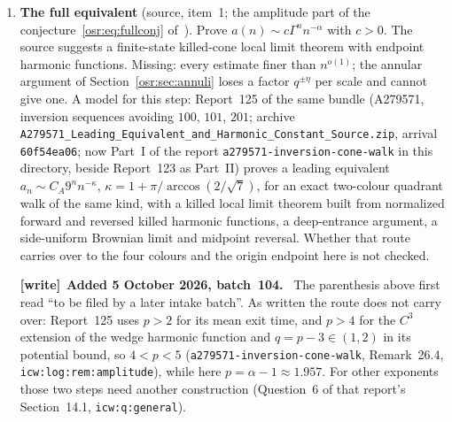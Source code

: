 \documentclass[11pt,letterpaper]{article}
\newcommand{\G}{\Gamma}\newcommand{\s}{\sqrt{17}}
\numberwithin{equation}{section}
\newenvironment{writenote}[1][]{\par\smallskip\begingroup\small
 \noindent\textbf{[write]}\if\relax\detokenize{#1}\relax\else~\textbf{#1.}\fi\ }%
 {\par\endgroup\smallskip}
\begin{document}
\begin{enumerate}
\item\label{osr:q:equivalent} \textbf{The full equivalent} (source, item~1;
 the amplitude part of the conjecture~\eqref{osr:eq:fullconj}
 of~\cite{rect}). Prove $a(n)\sim c\G^nn^{-\alpha}$ with $c>0$. The source
 suggests a finite-state killed-cone local limit theorem with endpoint
 harmonic functions. Missing: every estimate finer than $n^{o(1)}$; the
 annular argument of Section~\ref{osr:sec:annuli} loses a factor
 $q^{\pm\eta}$ per scale and cannot give one. A model for this step:
 Report~125 of the same bundle (A279571, inversion sequences avoiding $100$,
 $101$, $201$; archive
 \nolinkurl{A279571_Leading_Equivalent_and_Harmonic_Constant_Source.zip},
 arrival \nolinkurl{60f54ea06}; now Part~I of the report
 \nolinkurl{a279571-inversion-cone-walk} in this directory, beside Report~123 as Part~II) proves
 a leading equivalent $a_n\sim C_A9^nn^{-\kappa}$,
 $\kappa=1+\pi/\arccos(2/\sqrt7)$,
 for an exact two-colour quadrant walk of the same kind, with a killed local
 limit theorem built from normalized forward and reversed killed harmonic
 functions, a deep-entrance argument, a side-uniform Brownian limit and
 midpoint reversal. Whether that route carries over to the four colours and
 the origin endpoint here is not checked.
 \begin{writenote}[Added 5 October 2026, batch~104]
 The parenthesis above first read ``to be filed by a later intake batch''.
 As written the route does not carry over: Report~125 uses $p>2$ for its
 mean exit time, and $p>4$ for the $C^3$ extension of the wedge harmonic
 function and $q=p-3\in(1,2)$ in its potential bound, so $4<p<5$
 (\nolinkurl{a279571-inversion-cone-walk}, Remark~26.4,
 \nolinkurl{icw:log:rem:amplitude}), while here $p=\alpha-1\approx1.957$.
 For other exponents those two steps need another construction (Question~6
 of that report's Section~14.1, \nolinkurl{icw:q:general}).
 \end{writenote}


\end{enumerate}
\end{document}

